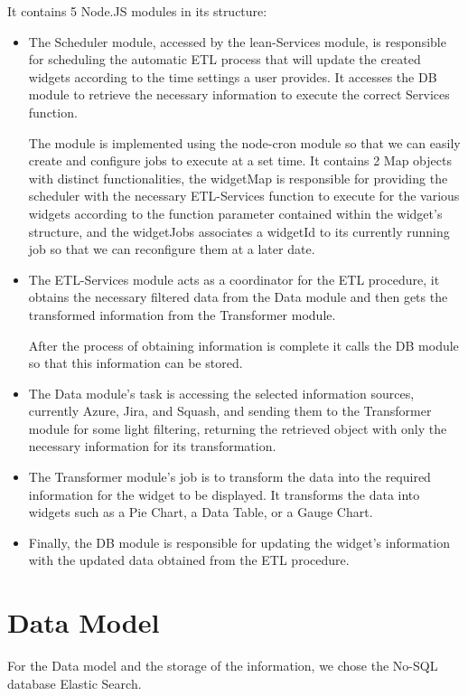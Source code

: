 \documentclass[a4paper,twoside,10pt]{report}
\begin{document}
It contains 5 Node.JS modules in its structure:
\begin{itemize}
  \item The Scheduler module, accessed by the lean-Services module, is responsible for scheduling the automatic ETL process that will update the created widgets according to the time settings a user provides. It accesses the DB module to retrieve the necessary information to execute the correct Services function.

The module is implemented using the node-cron\cite{NODECRON} module so that we can easily create and configure jobs to execute at a set time.
It contains 2 Map objects with distinct functionalities, the widgetMap is responsible for providing the scheduler with the necessary ETL-Services function to execute for the various widgets according to the function parameter contained within the widget's structure, and the widgetJobs associates a widgetId to its currently running job so that we can reconfigure them at a later date.
  \item The ETL-Services module acts as a coordinator for the ETL procedure, it obtains the necessary filtered data from the Data module and then gets the transformed information from the Transformer module.

After the process of obtaining information is complete it calls the DB module so that this information can be stored.
  \item The Data module's task is accessing the selected information sources, currently Azure, Jira, and Squash, and sending them to the Transformer module for some light filtering, returning the retrieved object with only the necessary information for its transformation.
  \item The Transformer module's job is to transform the data into the required information for the widget to be displayed. It transforms the data into widgets such as a Pie Chart, a Data Table, or a Gauge Chart.
  \item Finally, the DB module is responsible for updating the widget's information with the updated data obtained from the ETL procedure.
\end{itemize}

\newpage
\section{Data Model}
For the Data model and the storage of the information, we chose the No-SQL database Elastic Search.
 
\end{document}
